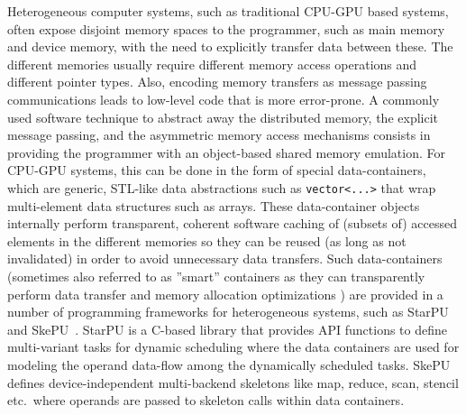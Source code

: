 Heterogeneous computer systems, such as traditional CPU-GPU based systems, 
often expose disjoint memory spaces to the programmer,
such as main memory and device memory, with the need
to explicitly transfer data between these.
The different memories usually 
require different memory access operations and
different pointer types. %
Also, encoding memory transfers as message passing communications
leads to low-level code that is more error-prone. 
A commonly used software technique to abstract away the
distributed memory, the explicit message passing,
and the asymmetric memory access mechanisms
consists in providing the programmer with an 
object-based shared memory emulation. For CPU-GPU systems,
this can be done in the form of special data-containers,
which are generic, STL-like data abstractions such as 
\verb+vector<...>+ that 
wrap multi-element data structures such as arrays. These 
data-container objects
 internally perform transparent, coherent
software caching
of (subsets of) accessed elements in the different memories 
so they can be reused (as long as not invalidated) 
in order to
avoid unnecessary data transfers. Such data-containers 
(sometimes also referred to as ''smart'' containers as they can
transparently perform data transfer and memory allocation optimizations
\cite{Dastgeer-IJPP15}) 
are provided in a number of programming frameworks 
for heterogeneous systems, such as
StarPU \cite{StarPU} and SkePU~\cite{Enmyren10,Dastgeer-IJPP15}. StarPU is a 
C-based library that provides API functions to
define multi-variant tasks for dynamic scheduling
where the data containers are used for modeling 
the operand data-flow
among the dynamically scheduled tasks. 
SkePU defines device-independent 
multi-backend skeletons like map, reduce,
scan, stencil etc.\ where operands are
passed to skeleton calls within data containers.

